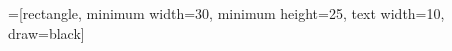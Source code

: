 \newcommand{\keta}[2][]{\vert {#2} \rangle_{#1}}
\newcommand{\braketa}[3][]{\langle {#2} \vert {#3}\rangle_{#1}}

=[rectangle, minimum width=30, minimum height=25, text width=10, draw=black]